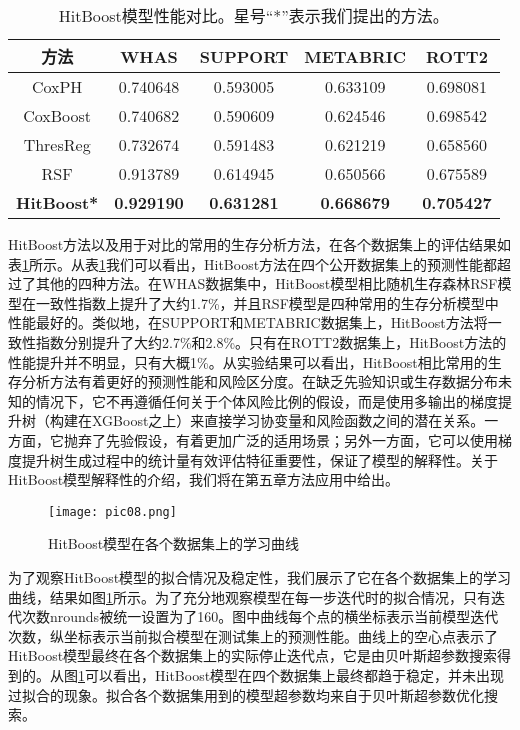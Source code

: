 \begin{table}[h]
\caption{HitBoost模型性能对比。星号“*”表示我们提出的方法。}
\begin{tabular}{ccccc}
\toprule
方法 & WHAS & SUPPORT & METABRIC & ROTT2 \\ 
\midrule
CoxPH & 0.740648 & 0.593005 & 0.633109 & 0.698081 \\
CoxBoost & 0.740682 & 0.590609 & 0.624546 & 0.698542 \\
ThresReg & 0.732674 & 0.591483 & 0.621219 & 0.658560 \\
RSF & 0.913789 & 0.614945 & 0.650566 & 0.675589 \\
\textbf{HitBoost*} & \textbf{0.929190} & \textbf{0.631281} & \textbf{0.668679} & \textbf{0.705427} \\
\bottomrule
\end{tabular}
\label{table04}
\end{table}

HitBoost方法以及用于对比的常用的生存分析方法，在各个数据集上的评估结果如表\ref{table04}所示。从表\ref{table04}我们可以看出，HitBoost方法在四个公开数据集上的预测性能都超过了其他的四种方法。在WHAS数据集中，HitBoost模型相比随机生存森林RSF模型在一致性指数上提升了大约1.7\%，并且RSF模型是四种常用的生存分析模型中性能最好的。类似地，在SUPPORT和METABRIC数据集上，HitBoost方法将一致性指数分别提升了大约2.7\%和2.8\%。只有在ROTT2数据集上，HitBoost方法的性能提升并不明显，只有大概1\%。从实验结果可以看出，HitBoost相比常用的生存分析方法有着更好的预测性能和风险区分度。在缺乏先验知识或生存数据分布未知的情况下，它不再遵循任何关于个体风险比例的假设，而是使用多输出的梯度提升树（构建在XGBoost之上）来直接学习协变量和风险函数之间的潜在关系。一方面，它抛弃了先验假设，有着更加广泛的适用场景；另外一方面，它可以使用梯度提升树生成过程中的统计量有效评估特征重要性，保证了模型的解释性。关于HitBoost模型解释性的介绍，我们将在第五章方法应用中给出。

\begin{figure}[H]
\texttt{[image: pic08.png]}
\caption{HitBoost模型在各个数据集上的学习曲线}
\label{pic08}
\end{figure}

为了观察HitBoost模型的拟合情况及稳定性，我们展示了它在各个数据集上的学习曲线，结果如图\ref{pic08}所示。为了充分地观察模型在每一步迭代时的拟合情况，只有迭代次数nrounds被统一设置为了160。图中曲线每个点的横坐标表示当前模型迭代次数，纵坐标表示当前拟合模型在测试集上的预测性能。曲线上的空心点表示了HitBoost模型最终在各个数据集上的实际停止迭代点，它是由贝叶斯超参数搜索得到的。从图\ref{pic08}可以看出，HitBoost模型在四个数据集上最终都趋于稳定，并未出现过拟合的现象。拟合各个数据集用到的模型超参数均来自于贝叶斯超参数优化搜索。


